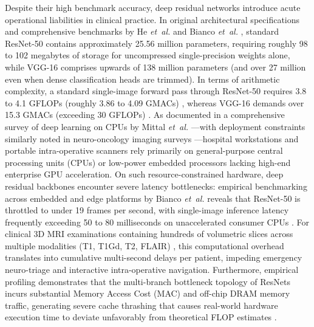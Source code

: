 Despite their high benchmark accuracy, deep residual networks introduce acute operational liabilities in clinical practice. In original architectural specifications and comprehensive benchmarks by He \emph{et~al.} \cite{10} and Bianco \emph{et~al.} \cite{43}, standard ResNet-50 contains approximately 25.56 million parameters, requiring roughly 98 to 102 megabytes of storage for uncompressed single-precision weights alone, while VGG-16 \cite{29} comprises upwards of 138 million parameters (and over 27 million even when dense classification heads are trimmed). In terms of arithmetic complexity, a standard single-image forward pass through ResNet-50 requires 3.8 to 4.1 GFLOPs (roughly 3.86 to 4.09 GMACs) \cite{10, 43}, whereas VGG-16 demands over 15.3 GMACs (exceeding 30 GFLOPs) \cite{29, 43}. As documented in a comprehensive survey of deep learning on CPUs by Mittal \emph{et~al.} \cite{25}---with deployment constraints similarly noted in neuro-oncology imaging surveys \cite{40}---hospital workstations and portable intra-operative scanners rely primarily on general-purpose central processing units (CPUs) or low-power embedded processors lacking high-end enterprise GPU acceleration. On such resource-constrained hardware, deep residual backbones encounter severe latency bottlenecks: empirical benchmarking across embedded and edge platforms by Bianco \emph{et~al.} \cite{43} reveals that ResNet-50 is throttled to under 19 frames per second, with single-image inference latency frequently exceeding 50 to 80 milliseconds on unaccelerated consumer CPUs \cite{25, 44}. For clinical 3D MRI examinations containing hundreds of volumetric slices across multiple modalities (T1, T1Gd, T2, FLAIR) \cite{2, 23, 45}, this computational overhead translates into cumulative multi-second delays per patient, impeding emergency neuro-triage and interactive intra-operative navigation. Furthermore, empirical profiling demonstrates that the multi-branch bottleneck topology of ResNets incurs substantial Memory Access Cost (MAC) and off-chip DRAM memory traffic, generating severe cache thrashing that causes real-world hardware execution time to deviate unfavorably from theoretical FLOP estimates \cite{25}.

